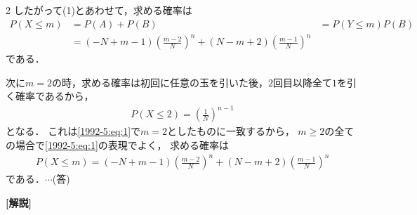 \documentclass[../../../../main.tex]{subfiles}
\begin{document}
\begin{multicols}{2}
  したがって(1)とあわせて，求める確率は
  \begin{align}
    P(X \le m)
     & = P(A)+P(B)
     & = P(Y \le m) P(B)                                                                                      \\
     & = (-N+m-1) \left( \frac{m-2}{N} \right)^n + (N-m+2) \left( \frac{m-1}{N} \right)^n \label{1992-5:eq:1}
  \end{align}
  である．

  次に$m=2$の時，求める確率は初回に任意の玉を引いた後，$2$回目以降全て$1$を引く確率であるから，
  \begin{align*}
    P(X\le 2) = \left( \frac{1}{N} \right)^{n-1}
  \end{align*}
  となる．
  これは\cref{1992-5:eq:1}で$m=2$としたものに一致するから，
  $m\ge 2$の全ての場合で\cref{1992-5:eq:1}の表現でよく，
  求める確率は
  \begin{align*}
    P(X \le m) = (-N+m-1) \left( \frac{m-2}{N} \right)^n + (N-m+2) \left( \frac{m-1}{N} \right)^n
  \end{align*}
  である．$\cdots$(答)

  \vspace{10pt}
  {\bf[解説]}

  \newpage
\end{multicols}
\end{document}
